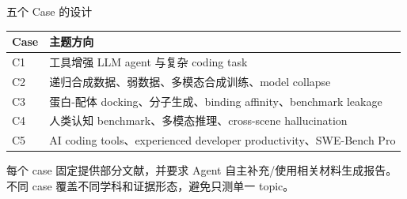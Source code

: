 \documentclass[UTF8,fontset=fandol,aspectratio=169]{ctexbeamer}
\begin{document}
\begin{frame}{五个 Case 的设计}
  \begin{tabularx}{\textwidth}{@{}lX@{}}
    \toprule
    Case & 主题方向 \\
    \midrule
    C1 & 工具增强 LLM agent 与复杂 coding task \\
    C2 & 递归合成数据、弱数据、多模态合成训练、model collapse \\
    C3 & 蛋白-配体 docking、分子生成、binding affinity、benchmark leakage \\
    C4 & 人类认知 benchmark、多模态推理、cross-scene hallucination \\
    C5 & AI coding tools、experienced developer productivity、SWE-Bench Pro \\
    \bottomrule
  \end{tabularx}

  \vspace{0.8em}
  每个 case 固定提供部分文献，并要求 Agent 自主补充/使用相关材料生成报告。不同 case 覆盖不同学科和证据形态，避免只测单一 topic。
\end{frame}
\end{document}
